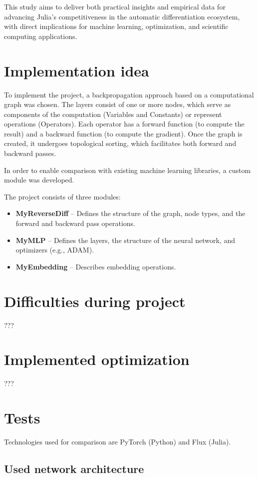 \documentclass[conference]{IEEEtran}
\begin{document}
This study aims to deliver both practical insights and empirical data for advancing 
Julia's competitiveness in the automatic differentiation ecosystem, 
with direct implications for machine learning, optimization, 
and scientific computing applications.

\section{Implementation idea}
To implement the project, a backpropagation approach based on a computational graph was chosen. The layers consist of one or more nodes, which serve as components of the computation (Variables and Constants) or represent operations (Operators). Each operator has a forward function (to compute the result) and a backward function (to compute the gradient). Once the graph is created, it undergoes topological sorting, which facilitates both forward and backward passes.

In order to enable comparison with existing machine learning libraries, a custom module was developed. 

The project consists of three modules:

\begin{itemize}
    \item \textbf{MyReverseDiff} – Defines the structure of the graph, node types, and the forward and backward pass operations.
    \item \textbf{MyMLP} – Defines the layers, the structure of the neural network, and optimizers (e.g., ADAM).
    \item \textbf{MyEmbedding} – Describes embedding operations.
\end{itemize}

\section{Difficulties during project}
???

\section{Implemented optimization}
???

\section{Tests}
Technologies used for comparison are PyTorch (Python) and Flux (Julia).

\subsection{Used network architecture}
\end{document}
